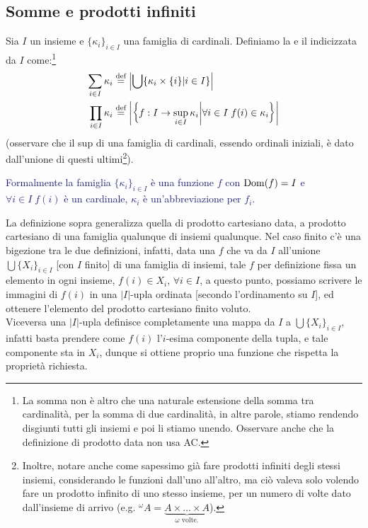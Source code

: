 \subsection{Somme e prodotti infiniti}

\begin{definition}
	Sia $I$ un insieme e $\{\kappa_i\}_{i \in I}$ una famiglia di cardinali. Definiamo la  e il  indicizzata da $I$ come:\footnote{La somma non è altro che una naturale estensione della somma tra cardinalità, per la somma di due cardinalità, in altre parole, stiamo rendendo disgiunti tutti gli insiemi e poi li stiamo unendo. Osservare anche che la definizione di prodotto data non usa AC.}
	 \begin{align*}
		\sum_{i \in I} \kappa_i &\overset{\text{def}}{=}\left\lvert \bigcup\{\kappa_i \times \{i\} | i \in I\}\right\rvert \\
		\prod_{i \in I} \kappa_i &\overset{\text{def}}{=} \left\lvert \left\{f : I \rightarrow \sup_{i \in I} \kappa_i \middle|  \forall i \in I \; f(i) \in \kappa_i\right\}\right\rvert 
	 \end{align*}
	(osservare che il sup di una famiglia di cardinali, essendo ordinali iniziali, è dato dall'unione di questi ultimi\footnote{Inoltre, notare anche come sapessimo già fare prodotti infiniti degli stessi insiemi, considerando le funzioni dall'uno all'altro, ma ciò valeva solo volendo fare un prodotto infinito di uno stesso insieme, per un numero di volte dato dall'insieme di arrivo
	(e.g. ${}^\omega A = \underbrace{A \times \ldots \times A}_{\text{$\omega$ volte}.}$).}).
\end{definition}

\textcolor{MidnightBlue}{Formalmente la famiglia $\{\kappa_i\}_{i \in I}$ è una funzione $f$ con $\operatorname{Dom}(f) = I$ e $\forall i \in I \; f(i)$ è un cardinale, $\kappa_i$ è un'abbreviazione per $f_i$.}

\begin{remark}
	La definizione sopra generalizza quella di prodotto cartesiano data, a prodotto cartesiano di una famiglia qualunque di insiemi qualunque. Nel caso finito c'è una bigezione tra le due definizioni, infatti, data una $f$ che va da $I$ all'unione $\bigcup \{X_i\}_{i \in I}$ [con $I$ finito] di una 
	famiglia di insiemi, tale $f$ per definizione fissa un elemento in ogni insieme, $f(i) \in X_i$, $\forall i \in I$, a questo punto, possiamo scrivere le immagini di $f(i)$ in una $|I|$-upla ordinata [secondo l'ordinamento su $I$], ed ottenere l'elemento del prodotto cartesiano finito voluto.\\
	Viceversa una $|I|$-upla definisce completamente una mappa da $I$ a $\bigcup\{X_i\}_{i \in I}$, infatti basta prendere come $f(i)$ l'$i$-esima componente della tupla, e tale componente sta in $X_i$, dunque si ottiene proprio una funzione che rispetta la proprietà richiesta.
\end{remark}


